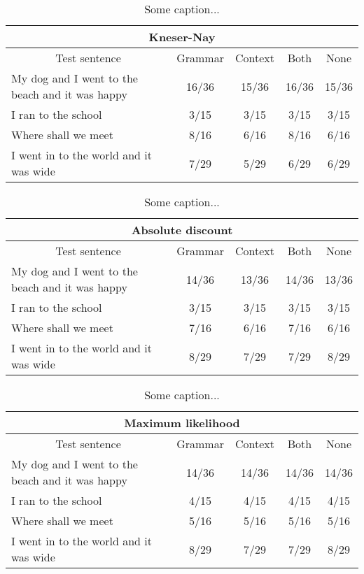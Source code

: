 
{\footnotesize
\begin{table}[H]
\centering
\caption{Some caption...}
\begin{tabular}{ |p{}|c|c|c|c| }
	\hline
	\multicolumn{5}{|c|}{Kneser-Nay} \\
	\hline
	\multicolumn{1}{|c|}{Test sentence} & Grammar & Context & Both & None \\
	\hline
	My dog and I went to the beach and it was happy & 16/36 & 15/36 & 16/36 & 15/36 \\
	\hline
	I ran to the school & 3/15 & 3/15 & 3/15 & 3/15 \\
	\hline
	Where shall we meet & 8/16 & 6/16 & 8/16 & 6/16 \\
	\hline
	I went in to the world and it was wide & 7/29 & 5/29 & 6/29 & 6/29 \\
	\hline
\end{tabular}
\end{table}

\vspace{-1cm}
\begin{table}[H]
\centering
\caption{Some caption...}
\begin{tabular}{ |p{}|c|c|c|c| }
	\hline
	\multicolumn{5}{|c|}{Absolute discount} \\
	\hline
	\multicolumn{1}{|c|}{Test sentence} & Grammar & Context & Both & None \\
	\hline
	My dog and I went to the beach and it was happy & 14/36 & 13/36 & 14/36 & 13/36 \\
	\hline
	I ran to the school & 3/15 & 3/15 & 3/15 & 3/15 \\
	\hline
	Where shall we meet & 7/16 & 6/16 & 7/16 & 6/16 \\
	\hline
	I went in to the world and it was wide & 8/29 & 7/29 & 7/29 & 8/29 \\
	\hline
\end{tabular}
\end{table}

\vspace{-1cm}
\begin{table}[H]
\centering
\caption{Some caption...}
\begin{tabular}{ |p{}|c|c|c|c| }
	\hline
	\multicolumn{5}{|c|}{Maximum likelihood} \\
	\hline
	\multicolumn{1}{|c|}{Test sentence} & Grammar & Context & Both & None \\
	\hline
	My dog and I went to the beach and it was happy & 14/36 & 14/36 & 14/36 & 14/36 \\
	\hline
	I ran to the school & 4/15 & 4/15 & 4/15 & 4/15 \\
	\hline
	Where shall we meet & 5/16 & 5/16 & 5/16 & 5/16 \\
	\hline
	I went in to the world and it was wide & 8/29 & 7/29 & 7/29 & 8/29 \\
	\hline
\end{tabular}
\end{table}
\vspace{-1cm}

}
